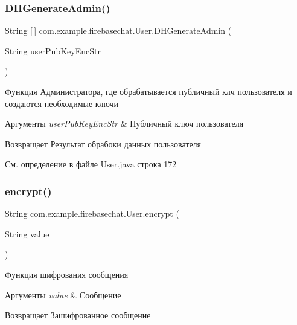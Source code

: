 \subsubsection{\texorpdfstring{D\+H\+Generate\+Admin()}{DHGenerateAdmin()}}
{\footnotesize\ttfamily String \mbox{[}$\,$\mbox{]} com.\+example.\+firebasechat.\+User.\+D\+H\+Generate\+Admin (\begin{DoxyParamCaption}\item[{String}]{user\+Pub\+Key\+Enc\+Str }\end{DoxyParamCaption})}



Функция Администратора, где обрабатывается публичный клч пользователя и создаются необходимые ключи 


\begin{DoxyParams}{Аргументы}
{\em user\+Pub\+Key\+Enc\+Str} & Публичный ключ пользователя \\
\hline
\end{DoxyParams}
\begin{DoxyReturn}{Возвращает}
Результат обрабоки данных пользователя 
\end{DoxyReturn}


См. определение в файле User.\+java строка 172

\mbox{\label{classcom_1_1example_1_1firebasechat_1_1_user_a7f85ab138092dde2b7f24fc263aaa8ae}} 
\subsubsection{\texorpdfstring{encrypt()}{encrypt()}}
{\footnotesize\ttfamily String com.\+example.\+firebasechat.\+User.\+encrypt (\begin{DoxyParamCaption}\item[{String}]{value }\end{DoxyParamCaption})}



Функция шифрования сообщения 


\begin{DoxyParams}{Аргументы}
{\em value} & Сообщение \\
\hline
\end{DoxyParams}
\begin{DoxyReturn}{Возвращает}
Зашифрованное сообщение 
\end{DoxyReturn}



